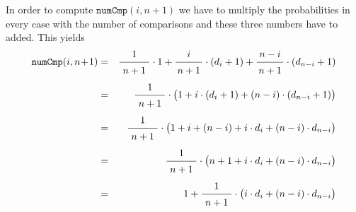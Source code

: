 In order to compute  $\texttt{numCmp}(i, n\!+\!1)$ we have to multiply the probabilities in every
case with the number of comparisons and these three numbers have to added.  This yields
\begin{eqnarray*}
  \texttt{numCmp}(i, n\!+\!1) 
& = & \bruch{1}{\,n+1\,} \cdot 1 + \bruch{i}{n+1} \cdot (d_i + 1) + \bruch{n-i}{n+1} \cdot (d_{n-i} + 1) 
      \\[0.2cm]
& = & \bruch{1}{\,n+1\,} \cdot \bigl(1 + i \cdot (d_i + 1) + (n-i) \cdot (d_{n-i} + 1)\bigr)      \\[0.2cm]
& = & \bruch{1}{\,n+1\,} \cdot \bigl(1 + i + (n-i) + i \cdot d_i + (n-i) \cdot d_{n-i} \bigr)    \\[0.2cm]
& = & \bruch{1}{\,n+1\,} \cdot \bigl(n + 1 + i \cdot d_i + (n-i) \cdot d_{n-i} \bigr)            \\[0.2cm]
& = & 1 + \bruch{1}{\,n+1\,} \cdot \bigl(i \cdot d_i + (n-i) \cdot d_{n-i} \bigr) 
\end{eqnarray*}


